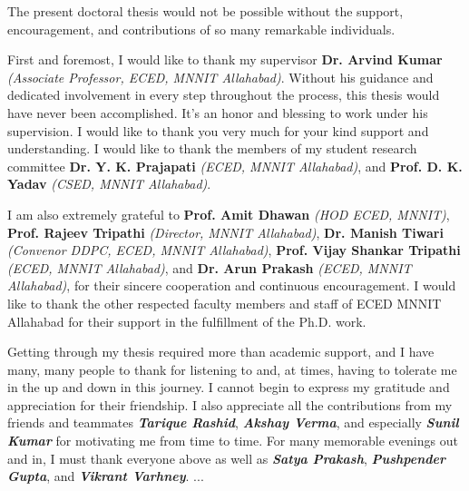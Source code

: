 The present doctoral thesis would not be possible without the support, encouragement, and contributions of so many remarkable individuals.
\par First and foremost, I would like to thank my supervisor \textbf{Dr. Arvind Kumar} \emph{(Associate Professor, ECED, MNNIT Allahabad)}. Without his guidance and dedicated involvement in every step throughout the process, this thesis would have never been accomplished. It's an honor and blessing to work under his supervision. I would like to thank you very much for your kind support and understanding. I would like to thank the members of my student research committee \textbf{Dr. Y. K. Prajapati} \emph{(ECED, MNNIT Allahabad)}, and \textbf{Prof. D. K. Yadav} \emph{(CSED, MNNIT Allahabad)}.
\par I am also extremely grateful to \textbf{Prof. Amit Dhawan} \emph{(HOD ECED, MNNIT)}, \textbf{Prof. Rajeev Tripathi} \emph{(Director, MNNIT Allahabad)}, \textbf{Dr. Manish Tiwari} \emph{(Convenor DDPC, ECED, MNNIT Allahabad)}, \textbf{Prof. Vijay Shankar Tripathi} \emph{(ECED, MNNIT Allahabad)}, and \textbf{Dr. Arun Prakash} \emph{(ECED, MNNIT Allahabad)}, for their sincere cooperation and continuous encouragement. I would like to thank the other respected faculty members and staff of ECED MNNIT Allahabad for their support in the fulfillment of the Ph.D. work.
\par Getting through my thesis required more than academic support, and I have many, many people to thank for listening to and, at times, having to tolerate me in the up and down in this journey. I cannot begin to express my gratitude and appreciation for their friendship. I also appreciate all the contributions from my friends and teammates \textbf{\textit{Tarique Rashid}}, \textbf{\textit{Akshay Verma}}, and especially \textbf{\textit{Sunil Kumar}} for motivating me from time to time. For many memorable evenings out and in, I must thank everyone above as well as \textbf{\textit{Satya Prakash}}, \textbf{\textit{Pushpender Gupta}}, and \textbf{\textit{Vikrant Varhney}}.
...


